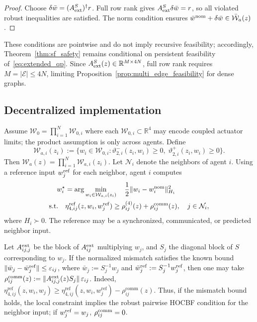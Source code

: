 \documentclass[journal,twoside,web]{ieeecolor}
\begin{document}
\begin{proof}
Choose $\delta\bar w=(A_{\rm ext}^S)^\dagger r$.
Full row rank gives $A_{\rm ext}^S\delta\bar w=r$,
so all violated robust inequalities are satisfied. The norm
condition ensures
$\bar w^{\rm nom}+\delta\bar w\in\bar{\mathcal W}_a(z)$.
\end{proof}

These conditions are pointwise and do not imply recursive
feasibility; accordingly, Theorem~\ref{thm:sf_safety} remains conditional on
persistent feasibility of~\eqref{eq:extended_qp}. Since
$A_{\rm ext}^S(z)\in\mathbb R^{M\times 4N}$, full row rank
requires $M=|\mathcal E|\le4N$, limiting
Proposition~\ref{prop:multi_edge_feasibility} for dense graphs.

\subsection{Decentralized implementation}

Assume $\mathcal W_0=\prod_{i=1}^N\mathcal W_{0,i}$ where each $\mathcal W_{0,i}\subset\mathbb R^4$ may encode
coupled actuator limits; the product assumption is only across agents. Define
\[
\mathcal W_{a,i}(z_i):=
\{w_i\in\mathcal W_{0,i}:
\vartheta_{2,i}^{-}(z_i,w_i)\ge0,\;
\vartheta_{2,i}^{+}(z_i,w_i)\ge0\}.
\]
Then $\mathcal W_a(z)=\prod_{i=1}^N\mathcal W_{a,i}(z_i)$.
Let $\mathcal N_i$ denote the neighbors of agent $i$.
Using a reference input $w_j^{\rm ref}$ for each neighbor,
agent $i$ computes
\[
\begin{aligned}
w_i^\star
&=\arg\min_{w_i\in\mathcal W_{a,i}(z_i)}\quad
\frac12\|w_i-w_i^{\rm nom}\|_{H_i}^2\\
{\rm s.t.}\quad&
\eta_{4,ij}^{\mathrm{ref}}(z,w_i,w_j^{\mathrm{ref}})
\ge
\rho_{ij}^{(4)}(z)+\rho_{ij}^{\rm comm}(z),
\quad j\in\mathcal N_i,
\end{aligned}
\]
where $H_i\succ0$. The reference may be a synchronized,
communicated, or predicted neighbor input.

Let $A_{ij,j}^{\rm ext}$ be the block of $A_{ij}^{\rm ext}$ multiplying $w_j$, and $S_j$ the diagonal block of $S$ corresponding
to $w_j$. If the normalized mismatch satisfies the known bound
$\|\bar w_j-\bar w_j^{\rm ref}\|\le\varepsilon_{ij}$, where
$\bar w_j:=S_j^{-1}w_j$ and
$\bar w_j^{\rm ref}:=S_j^{-1}w_j^{\rm ref}$, then one may take $\rho_{ij}^{\rm comm}(z)
:=
\|A_{ij,j}^{\rm ext}(z)S_j\|\,\varepsilon_{ij}$. Indeed,
$\eta_{4,ij}^{\mathrm{ref}}(z,w_i,w_j)
\geq
\eta_{4,ij}^{\mathrm{ref}}(z,w_i,w_j^{\mathrm{ref}})
-\rho_{ij}^{\mathrm{comm}}(z)$. Thus, if the mismatch bound holds, the local constraint implies the robust
pairwise HOCBF condition for the neighbor input; if $w_j^{\rm ref}=w_j$, $\rho_{ij}^{\rm comm}=0$.
\end{document}
